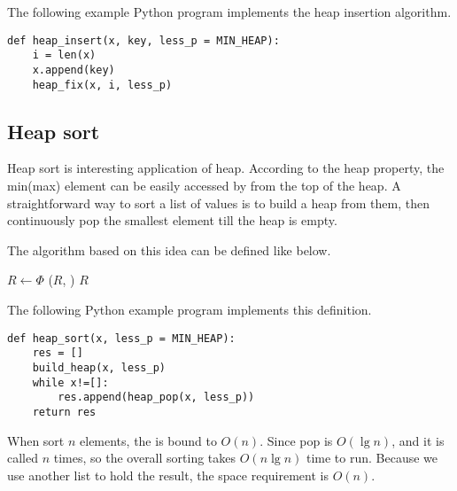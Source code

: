 \documentclass{article}
\begin{document}
\begin{algorithmic}[1]
  \State {}
  \State {}
\EndFunction
\end{algorithmic}

The following example Python program implements the heap insertion
algorithm.

\lstset{language=Python}
\begin{lstlisting}
def heap_insert(x, key, less_p = MIN_HEAP):
    i = len(x)
    x.append(key)
    heap_fix(x, i, less_p)
\end{lstlisting}

\subsection{Heap sort}
\label{heap-sort}

Heap sort is interesting application of heap. According
to the heap property, the min(max) element can be easily accessed
by from the top of the heap. A straightforward way to sort a list
of values is to build a heap from them, then continuously
pop the smallest element till the heap is empty.

The algorithm based on this idea can be defined like below.

\begin{algorithmic}[1]
  \State $R \gets \Phi$
  \State {}
    \State {}($R$, )
  \EndWhile
  \State \Return $R$
\EndFunction
\end{algorithmic}

The following Python example program implements this definition.

\lstset{language=Python}
\begin{lstlisting}
def heap_sort(x, less_p = MIN_HEAP):
    res = []
    build_heap(x, less_p)
    while x!=[]:
        res.append(heap_pop(x, less_p))
    return res
\end{lstlisting}

When sort $n$ elements, the  is bound to $O(n)$.
Since pop is $O(\lg n)$, and it
is called $n$ times, so the overall sorting takes $O(n \lg n)$
time to run. Because we use another list to hold the result,
the space requirement is $O(n)$.
\end{document}
